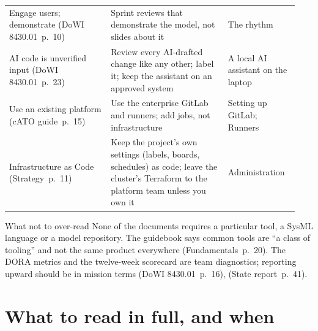 \documentclass[11pt,letterpaper,twoside,openany]{memoir}
\newcommand{\pg}[2]{{\small(#1~p.~#2)}}          %
\begin{document}
\begin{longtable}{@{}L{0.33\linewidth}L{0.38\linewidth}L{0.23\linewidth}@{}}
Engage users; demonstrate \pg{DoWI 8430.01}{10} & Sprint reviews that demonstrate the model, not slides about it & The rhythm\\
AI code is unverified input \pg{DoWI 8430.01}{23} & Review every AI-drafted change like any other; label it; keep the assistant on an approved system & A local AI assistant on the laptop\\
Use an existing platform \pg{cATO guide}{15} & Use the enterprise GitLab and runners; add jobs, not infrastructure & Setting up GitLab; Runners\\
Infrastructure as Code \pg{Strategy}{11} & Keep the project's own settings (labels, boards, schedules) as code; leave the cluster's Terraform to the platform team unless you own it & Administration\\
\end{longtable}

\begin{boxnote}{What not to over-read}
None of the documents requires a particular tool, a SysML language or a model repository. The guidebook says common
tools are ``a class of tooling'' and not the same product everywhere \pg{Fundamentals}{20}. The DORA metrics and the
twelve-week scorecard are team diagnostics; reporting upward should be in mission terms \pg{DoWI 8430.01}{16},
\pg{State report}{41}.
\end{boxnote}

\chapter{What to read in full, and when}\label{ch:read}
\end{document}
